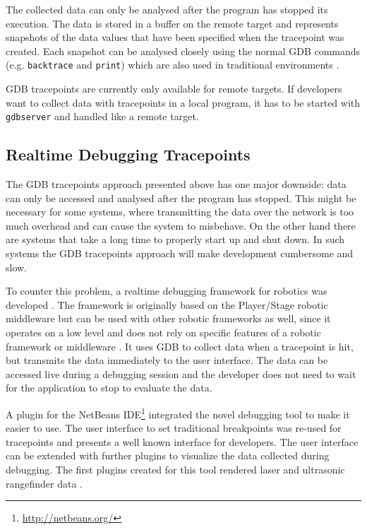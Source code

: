 The collected data can only be analysed after the program has stopped its execution. The data is stored in a buffer on the remote target and represents snapshots of the data values that have been specified when the tracepoint was created. Each snapshot can be analysed closely using the normal GDB commands (e.g. \verb+backtrace+ and \verb+print+) which are also used in traditional environments \cite{Stallman2002}.

GDB tracepoints are currently only available for remote targets. If developers want to collect data with tracepoints in a local program, it has to be started with \verb+gdbserver+ and handled like a remote target.

\subsection{Realtime Debugging Tracepoints}
\label{realtime_debugging}
The GDB tracepoints approach presented above has one major downside: data can only be accessed and analysed after the program has stopped. This might be necessary for some systems, where transmitting the data over the network is too much overhead and can cause the system to misbehave. On the other hand there are systems that take a long time to properly start up and shut down. In such systems the GDB tracepoints approach will make development cumbersome and slow.

To counter this problem, a realtime debugging framework for robotics was developed \cite{Gumbley2009}. The framework is originally based on the Player/Stage robotic middleware but can be used with other robotic frameworks as well, since it operates on a low level and does not rely on specific features of a robotic framework or middleware \cite{Gumbley2009}. It uses GDB to collect data when a tracepoint is hit, but transmits the data immediately to the user interface. The data can be accessed live during a debugging session and the developer does not need to wait for the application to stop to evaluate the data.

A plugin for the NetBeans IDE\footnote{\url{http://netbeans.org/}} integrated the novel debugging tool to make it easier to use. The user interface to set traditional breakpoints was re-used for tracepoints and presents a well known interface for developers. The user interface can be extended with further plugins to visualize the data collected during debugging. The first plugins created for this tool rendered laser and ultrasonic rangefinder data \cite{Gumbley2009}.

